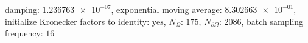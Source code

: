 damping: $\num[scientific-notation=true]{1.236763e-07}$, exponential moving average: $\num[scientific-notation=true]{8.302663e-01}$, initialize Kronecker factors to identity: $\text{yes}$, $N_{\Omega}$: $\num[scientific-notation=false]{175}$, $N_{\partial\Omega}$: $\num[scientific-notation=false]{2086}$, batch sampling frequency: $\num[scientific-notation=false]{16}$